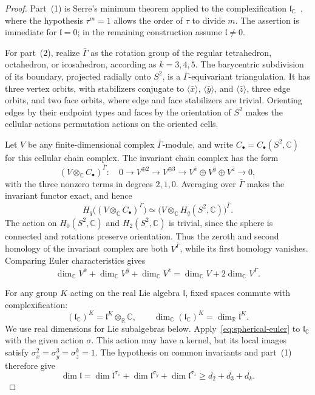 \documentclass[11pt,a4paper,reqno]{amsart}
\theoremstyle{plain}
\theoremstyle{definition}
\theoremstyle{remark}
\numberwithin{equation}{section}
\newcommand{\CC}{\mathbb C}
\newcommand{\RR}{\mathbb R}
\newcommand{\fl}{\mathfrak l}
\begin{document}
\begin{proof}
Part~(1) is Serre's minimum theorem applied to the complexification $\fl_{\CC}$~\cite[Theorem~1 and~\S3]{EKV}, where the hypothesis $\tau^m=1$ allows the order of $\tau$ to divide $m$. The assertion is immediate for $\fl=0$; in the remaining construction assume $\fl\ne0$.

For part~(2), realize $\bar\Gamma$ as the rotation group of the regular tetrahedron, octahedron, or icosahedron, according as $k=3,4,5$. The barycentric subdivision of its boundary, projected radially onto $S^2$, is a $\bar\Gamma$-equivariant triangulation. It has three vertex orbits, with stabilizers conjugate to $\langle \bar x\rangle$, $\langle \bar y\rangle$, and $\langle \bar z\rangle$, three edge orbits, and two face orbits, where edge and face stabilizers are trivial. Orienting edges by their endpoint types and faces by the orientation of $S^2$ makes the cellular actions permutation actions on the oriented cells.

Let $V$ be any finite-dimensional complex $\bar\Gamma$-module, and write $C_\bullet=C_\bullet(S^2,\CC)$ for this cellular chain complex. The invariant chain complex has the form
\[
(V\otimes_{\CC}C_\bullet)^{\bar\Gamma}:
\quad
0\longrightarrow V^{\oplus2}
\longrightarrow V^{\oplus3}
\longrightarrow V^{\bar x}\oplus V^{\bar y}\oplus V^{\bar z}
\longrightarrow0,
\]
with the three nonzero terms in degrees $2,1,0$. Averaging over $\bar\Gamma$ makes the invariant functor exact, and hence
\[
H_q\bigl((V\otimes_{\CC}C_\bullet)^{\bar\Gamma}\bigr)
\simeq
\bigl(V\otimes_{\CC}H_q(S^2,\CC)\bigr)^{\bar\Gamma}.
\]
The action on $H_0(S^2,\CC)$ and $H_2(S^2,\CC)$ is trivial, since the sphere is connected and rotations preserve orientation. Thus the zeroth and second homology of the invariant complex are both $V^{\bar\Gamma}$, while its first homology vanishes. Comparing Euler characteristics gives
\begin{equation}\label{eq:spherical-euler}
\dim_{\CC}V^{\bar x}+\dim_{\CC}V^{\bar y}+\dim_{\CC}V^{\bar z}
=\dim_{\CC}V+2\dim_{\CC}V^{\bar\Gamma}.
\end{equation}

For any group $K$ acting on the real Lie algebra $\fl$, fixed spaces commute with complexification:
\[
(\fl_{\CC})^K=\fl^K\otimes_{\RR}\CC,\qquad
\dim_{\CC}(\fl_{\CC})^K=\dim_{\RR}\fl^K.
\]
We use real dimensions for Lie subalgebras below. Apply~\eqref{eq:spherical-euler} to $\fl_{\CC}$ with the given action $\sigma$. This action may have a kernel, but its local images satisfy $\sigma_{\bar x}^2=\sigma_{\bar y}^3=\sigma_{\bar z}^k=1$. The hypothesis on common invariants and part~(1) therefore give
\[
\dim\fl
=\dim\fl^{\sigma_{\bar x}}+\dim\fl^{\sigma_{\bar y}}+\dim\fl^{\sigma_{\bar z}}
\ge d_2+d_3+d_k.
\]


\end{proof}
\end{document}
